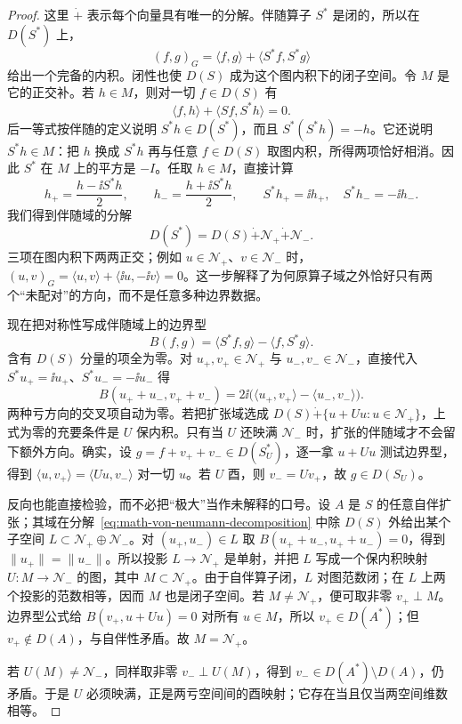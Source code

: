 \begin{proof}
这里 \(\dot+\) 表示每个向量具有唯一的分解。伴随算子 \(S^*\) 是闭的，所以在 \(D(S^*)\) 上，
\[
 (f,g)_G=\langle f,g\rangle+\langle S^*f,S^*g\rangle
\]
给出一个完备的内积。闭性也使 \(D(S)\) 成为这个图内积下的闭子空间。令 \(M\) 是它的正交补。若 \(h\in M\)，则对一切 \(f\in D(S)\) 有
\[
 \langle f,h\rangle+\langle Sf,S^*h\rangle=0.
\]
后一等式按伴随的定义说明 \(S^*h\in D(S^*)\)，而且 \(S^*(S^*h)=-h\)。它还说明 \(S^*h\in M\)：把 \(h\) 换成 \(S^*h\) 再与任意 \(f\in D(S)\) 取图内积，所得两项恰好相消。因此 \(S^*\) 在 \(M\) 上的平方是 \(-I\)。任取 \(h\in M\)，直接计算
\[
 h_+=\frac{h-\ii S^*h}{2},\qquad
 h_-=\frac{h+\ii S^*h}{2},\qquad
 S^*h_+=\ii h_+,\quad S^*h_-=-\ii h_-.
\]
我们得到伴随域的分解
\begin{equation}
 D(S^*)=D(S)\mathbin{\dot+}\mathcal N_+\mathbin{\dot+}\mathcal N_-.
 \label{eq:math-von-neumann-decomposition}
\end{equation}
三项在图内积下两两正交；例如 \(u\in\mathcal N_+\)、\(v\in\mathcal N_-\) 时，\((u,v)_G=\langle u,v\rangle+\langle\ii u,-\ii v\rangle=0\)。这一步解释了为何原算子域之外恰好只有两个“未配对”的方向，而不是任意多种边界数据。

现在把对称性写成伴随域上的边界型
\[
 B(f,g)=\langle S^*f,g\rangle-\langle f,S^*g\rangle.
\]
含有 \(D(S)\) 分量的项全为零。对 \(u_+,v_+\in\mathcal N_+\) 与 \(u_-,v_-\in\mathcal N_-\)，直接代入 \(S^*u_+=\ii u_+\)、\(S^*u_-=-\ii u_-\) 得
\[
 B(u_++u_-,v_++v_-)
 =2\ii\bigl(\langle u_+,v_+\rangle-\langle u_-,v_-\rangle\bigr).
\]
两种亏方向的交叉项自动为零。若把扩张域选成 \(D(S)\dot+\{u+Uu:u\in\mathcal N_+\}\)，上式为零的充要条件是 \(U\) 保内积。只有当 \(U\) 还映满 \(\mathcal N_-\) 时，扩张的伴随域才不会留下额外方向。确实，设 \(g=f+v_++v_-\in D(S_U^*)\)，逐一拿 \(u+Uu\) 测试边界型，得到 \(\langle u,v_+\rangle=\langle Uu,v_-\rangle\) 对一切 \(u\)。若 \(U\) 酉，则 \(v_-=Uv_+\)，故 \(g\in D(S_U)\)。

反向也能直接检验，而不必把“极大”当作未解释的口号。设 \(A\) 是 \(S\) 的任意自伴扩张；其域在分解~\cref{eq:math-von-neumann-decomposition} 中除 \(D(S)\) 外给出某个子空间 \(L\subset\mathcal N_+\oplus\mathcal N_-\)。对 \((u_+,u_-)\in L\) 取 \(B(u_++u_-,u_++u_-)=0\)，得到 \(\|u_+\|=\|u_-\|\)。所以投影 \(L\to\mathcal N_+\) 是单射，并把 \(L\) 写成一个保内积映射 \(U:M\to\mathcal N_-\) 的图，其中 \(M\subset\mathcal N_+\)。由于自伴算子闭，\(L\) 对图范数闭；在 \(L\) 上两个投影的范数相等，因而 \(M\) 也是闭子空间。若 \(M\ne\mathcal N_+\)，便可取非零 \(v_+\perp M\)。边界型公式给 \(B(v_+,u+Uu)=0\) 对所有 \(u\in M\)，所以 \(v_+\in D(A^*)\)；但 \(v_+\notin D(A)\)，与自伴性矛盾。故 \(M=\mathcal N_+\)。

若 \(U(M)\ne\mathcal N_-\)，同样取非零 \(v_-\perp U(M)\)，得到 \(v_-\in D(A^*)\setminus D(A)\)，仍矛盾。于是 \(U\) 必须映满，正是两亏空间间的酉映射；它存在当且仅当两空间维数相等。

\end{proof}

